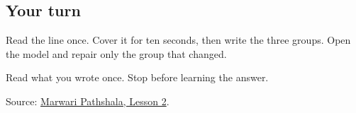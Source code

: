 \subsection*{Your turn}
Read the line once. Cover it for ten seconds, then write the three groups. Open the model and repair only the group that changed.

\begin{tcolorbox}[breakable,colback=teal!4,colframe=teal!35!black,title={Before you move on}]
Read what you wrote once. Stop before learning the answer.

Source: \href{https://www.marwaripathshala.com/marwari-lesson-2-english}{Marwari Pathshala, Lesson 2}.
\end{tcolorbox}
